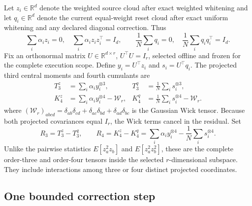 \documentclass[11pt]{article}
\theoremstyle{definition}
\theoremstyle{remark}
\begin{document}
Let $z_i\in\mathbb R^d$ denote the weighted source cloud after exact weighted
whitening and let $q_i\in\mathbb R^d$ denote the current equal-weight reset
cloud after exact uniform whitening and any declared diagonal correction.
Thus
\begin{equation}
 \sum_i\alpha_i z_i=0,\quad
 \sum_i\alpha_i z_i z_i^\top=I_d,\qquad
 \frac1N\sum_iq_i=0,\quad
 \frac1N\sum_iq_iq_i^\top=I_d.
 \label{eq:gsv-lr-whitened-clouds}
\end{equation}
Fix an orthonormal matrix $U\in\mathbb R^{d\times r}$, $U^\top U=I_r$,
selected offline and frozen for the complete execution scope.  Define
$y_i=U^\top z_i$ and $s_i=U^\top q_i$.  The projected third central moments
and fourth cumulants are
\begin{align}
 T_3^z&=\sum_i\alpha_i y_i^{\otimes3}, &
 T_3^q&=\frac1N\sum_i s_i^{\otimes3},
 \label{eq:gsv-lr-third}\\
 K_4^z&=\sum_i\alpha_i y_i^{\otimes4}-\mathcal W_r, &
 K_4^q&=\frac1N\sum_i s_i^{\otimes4}-\mathcal W_r.
 \label{eq:gsv-lr-fourth}
\end{align}
where
$(\mathcal W_r)_{abcd}=\delta_{ab}\delta_{cd}+
\delta_{ac}\delta_{bd}+\delta_{ad}\delta_{bc}$ is the Gaussian Wick tensor.
Because both projected covariances equal $I_r$, the Wick terms cancel in the
residual.  Set
\begin{equation}
 R_3=T_3^z-T_3^q,\qquad R_4=K_4^z-K_4^q
 =\sum_i\alpha_i y_i^{\otimes4}-\frac1N\sum_i s_i^{\otimes4}.
 \label{eq:gsv-lr-residuals}
\end{equation}
Unlike the pairwise statistics $E[z_a^2z_b]$ and $E[z_a^2z_b^2]$, these are
the complete order-three and order-four tensors inside the selected
$r$-dimensional subspace.  They include interactions among three or four
distinct projected coordinates.

\subsection{One bounded correction step}
\end{document}
